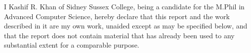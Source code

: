 
\begin{declaration}

I Kashif R. Khan  of Sidney Sussex College, being a candidate for the M.Phil in
Advanced Computer Science, hereby declare that this report and the work
described in it are my own work, unaided except as may be specified below,
and that the report does not contain material that has already been used to
any substantial extent for a comparable purpose.


\end{declaration}